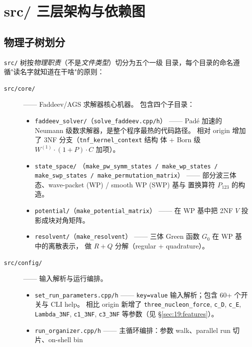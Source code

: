 \section{src/ 三层架构与依赖图}
\label{sec:19:layout}

\subsection{物理子树划分}

\texttt{src/} 树按\emph{物理职责}（不是\emph{文件类型}）切分为五个一级
目录，每个目录的命名遵循"读名字就知道在干啥"的原则：

\begin{description}
\item[\texttt{src/core/}] —— Faddeev/AGS 求解器核心机器。
   包含四个子目录：
   \begin{itemize}
   \item \texttt{faddeev\_solver/}（\texttt{solve\_faddeev.cpp/h}）
         —— Padé 加速的 Neumann 级数求解器，是整个程序最热的代码路径。
         相对 origin 增加了 3NF 分支（\texttt{tnf\_kernel\_context} 结构
         体 + Born 级 $W^{(1)}\cdot(1+P)\cdot C$ 加项）。
   \item \texttt{state\_space/}
         （\texttt{make\_pw\_symm\_states / make\_wp\_states /
         make\_swp\_states / make\_permutation\_matrix}）
         —— 部分波三体态、wave-packet (WP) / smooth WP (SWP) 基与
         置换算符 $P_{123}$ 的构造。
   \item \texttt{potential/}（\texttt{make\_potential\_matrix}）
         —— 在 WP 基中把 2NF $V$ 投影成块对角矩阵。
   \item \texttt{resolvent/}（\texttt{make\_resolvent}）
         —— 三体 Green 函数 $G_0$ 在 WP 基中的离散表示，
         做 $R + Q$ 分解（regular + quadrature）。
   \end{itemize}
\item[\texttt{src/config/}] —— 输入解析与运行编排。
   \begin{itemize}
   \item \texttt{set\_run\_parameters.cpp/h}
         —— \texttt{key=value} 输入解析；包含 60+ 个开关与 CLI help。
         相比 origin 新增了 \texttt{three\_nucleon\_force},
         \texttt{c\_D}, \texttt{c\_E}, \texttt{Lambda\_3NF},
         \texttt{c1\_3NF}, \texttt{c3\_3NF} 等参数（见
         §\ref{sec:19:features}）。
   \item \texttt{run\_organizer.cpp/h}
         —— 主循环编排：参数 walk、parallel run 切片、on-shell bin

\end{itemize}
\end{description}
